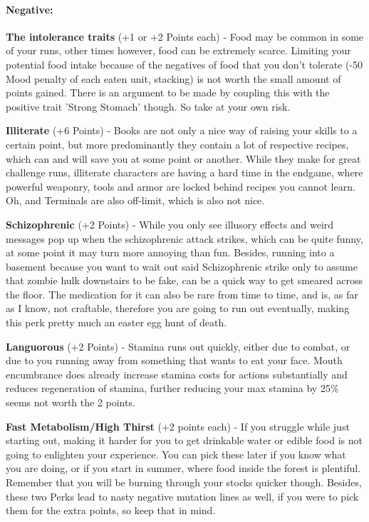 \paragraph{Negative:}

\textbf{The intolerance traits} (+1 or +2 Points each) - Food may be common in some of your runs, other times however, food can be extremely scarce. Limiting your potential food intake because of the negatives of food that you don't tolerate (-50 Mood penalty of each eaten unit, stacking) is not worth the small amount of points gained. There is an argument to be made by coupling this with the positive trait 'Strong Stomach' though. So take at your own risk.

\textbf{Illiterate} (+6 Points) - Books are not only a nice way of raising your skills to a certain point, but more predominantly they contain a lot of respective recipes, which can and will save you at some point or another. While they make for great challenge runs, illiterate characters are having a hard time in the endgame, where powerful weaponry, tools and armor are locked behind recipes you cannot learn. Oh, and Terminals are also off-limit, which is also not nice.

\textbf{Schizophrenic} (+2 Points) - While you only see illusory effects and weird messages pop up when the schizophrenic attack strikes, which can be quite funny, at some point it may turn more annoying than fun. Besides, running into a basement because you want to wait out said Schizophrenic strike only to assume that zombie hulk downstairs to be fake, can be a quick way to get smeared across the floor. The medication for it can also be rare from time to time, and is, as far as I know, not craftable, therefore you are going to run out eventually, making this perk pretty much an easter egg hunt of death.

\textbf{Languorous} (+2 Points) - Stamina runs out quickly, either due to combat, or due to you running away from something that wants to eat your face. Mouth encumbrance does already increase stamina costs for actions substantially and reduces regeneration of stamina, further reducing your max stamina by 25\% seems not worth the 2 points.

\textbf{Fast Metabolism/High Thirst} (+2 points each) - If you struggle while just starting out, making it harder for you to get drinkable water or edible food is not going to enlighten your experience. You can pick these later if you know what you are doing, or if you start in summer, where food inside the forest is plentiful. Remember that you will be burning through your stocks quicker though.
Besides, these two Perks lead to nasty negative mutation lines as well, if you were to pick them for the extra points, so keep that in mind.

